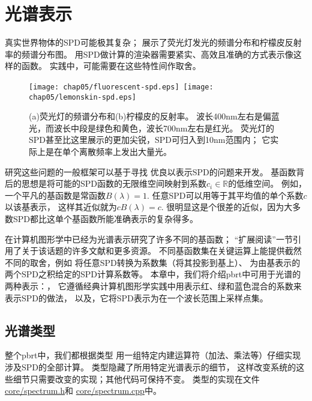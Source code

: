 \section{光谱表示}\label{sec:光谱表示}

真实世界物体的SPD可能极其复杂；
展示了荧光灯发光的频谱分布和柠檬皮反射率的频谱分布图。
用SPD做计算的渲染器需要紧实、高效且准确的方式表示像这样的函数。
实践中，可能需要在这些特性间作取舍。
\begin{figure}[htbp]
    \centering
    \texttt{[image: chap05/fluorescent-spd.eps]}\,\nolinebreak
    \texttt{[image: chap05/lemonskin-spd.eps]}
    \caption{(a)荧光灯的频谱分布和(b)柠檬皮的反射率。
        波长400nm左右是偏蓝光，而波长中段是绿色和黄色，波长700nm左右是红光。
        荧光灯的SPD甚至比这里展示的更加尖锐，SPD可归入到10nm范围内；
        它实际上是在单个离散频率上发出大量光。}
    \label{fig:5.1}
\end{figure}

研究这些问题的一般框架可以基于寻找
优良以表示SPD的问题来开发。
基函数背后的思想是将可能的SPD函数的无限维空间映射到系数$c_i\in\mathbb{R}$的低维空间。
例如，一个平凡的基函数是常函数$B(\lambda)=1$.
任意SPD可以用等于其平均值的单个系数$c$以该基表示，
这样其近似就为$cB(\lambda)=c$.
很明显这是个很差的近似，因为大多数SPD都比这单个基函数所能准确表示的复杂得多。

在计算机图形学中已经为光谱表示研究了许多不同的基函数；
“扩展阅读”一节引用了关于该话题的许多文献和更多资源。
不同基函数集在关键运算上能提供截然不同的取舍，例如
将任意SPD转换为系数集（将其投影到基上）、
为由基表示的两个SPD之积给定的SPD计算系数等。
本章中，我们将介绍pbrt中可用于光谱的两种表示：，
它遵循经典计算机图形学实践中用表示红、绿和蓝色混合的系数来表示SPD的做法，
以及，它将SPD表示为在一个波长范围上采样点集。

\subsection{光谱类型}\label{sub:光谱类型}
整个pbrt中，我们都根据类型
用一组特定内建运算符（加法、乘法等）仔细实现涉及SPD的全部计算。
类型隐藏了所用特定光谱表示的细节，
这样改变系统的这些细节只需要改变的实现；其他代码可保持不变。
类型的实现在文件\href{https://github.com/mmp/pbrt-v3/blob/master/src/core/spectrum.h}{\ttfamily core/spectrum.h}和
\href{https://github.com/mmp/pbrt-v3/blob/master/src/core/spectrum.cpp}{\ttfamily core/spectrum.cpp}中。

